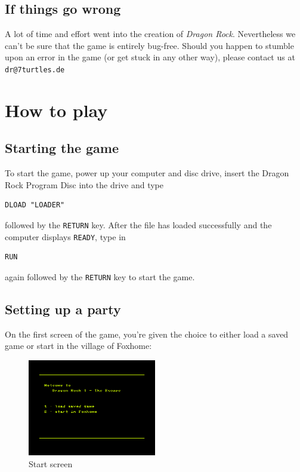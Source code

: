\documentclass[12pt]{scrbook}
\begin{document}
\section*{If things go wrong}
A lot of time and effort went into the creation of \textit{Dragon Rock}. Nevertheless we can't be sure that the game is entirely bug-free. Should you happen to stumble upon an error in the game (or get stuck in any other way), please contact us at \texttt{dr@7turtles.de}


\chapter{How to play}

\section*{Starting the game}
To start the game, power up your computer and disc drive, insert the Dragon Rock Program Disc into the drive and type
\begin{verbatim}
DLOAD "LOADER"
\end{verbatim}
followed by the \texttt{RETURN} key. After the file has loaded successfully and the computer displays \texttt{READY}, type in
\begin{verbatim}
RUN
\end{verbatim}
again followed by the \texttt{RETURN} key to start the game.

\section*{Setting up a party}
On the first screen of the game, you're given the choice to either load a saved game or start in the village of Foxhome:

\begin{figure}[ht]
    \centering
    \includegraphics[width=0.5\textwidth]{startscreen}
    \caption{Start screen}
\end{figure}
\end{document}
